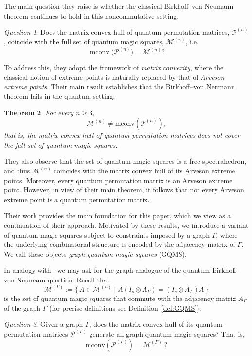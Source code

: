 \documentclass[11pt, a4paper]{article}
\theoremstyle{plain}
\newtheorem{theorem}{Theorem}[section]
\theoremstyle{definition}
\theoremstyle{remark}
\newtheorem{question}[theorem]{Question}
\newcommand{\cM}{\mathcal{M}} \newcommand{\cN}{\mathcal{N}} \newcommand{\cO}{\mathcal{O}}
\newcommand{\cP}{\mathcal{P}} \newcommand{\cQ}{\mathcal{Q}} \newcommand{\cR}{\mathcal{R}}
\newcommand{\cMn}{\mathcal{M}^{(n)}}
\newcommand{\cPn}{\mathcal{P}^{(n)}}
\newcommand{\cPG}{\mathcal{P}^{(\Gamma)}}
\begin{document}
The main question they raise is whether the classical Birkhoff--von Neumann theorem continues to hold in this noncommutative setting.
\begin{question}
Does the matrix convex hull of quantum permutation matrices, \(\cPn\), coincide with the full set of quantum magic squares, \(\cMn\), i.e.
\[
\operatorname{mconv}\bigl(\mathcal{P}^{(n)}\bigr) = \mathcal{M}^{(n)}?
\]
\end{question}
To address this, they adopt the framework of \emph{matrix convexity}, where the classical notion of extreme points is naturally replaced by that of \emph{Arveson extreme points}.  
Their main result establishes that the Birkhoff–von Neumann theorem fails in the quantum setting:

\begin{theorem}\label{thm:DDN}
For every \( n \ge 3 \),
\[
\mathcal{M}^{(n)} \neq \mathrm{mconv}(\mathcal{P}^{(n)}),
\]
that is, the matrix convex hull of quantum permutation matrices does not cover 
the full set of quantum magic squares.
\end{theorem}

They also observe that the set of quantum magic squares is a free spectrahedron, and thus
\(\mathcal{M}^{(n)}\) coincides with the matrix convex hull of its Arveson extreme points. 
Moreover, every quantum permutation matrix is an Arveson extreme point.
However, in view of their main theorem, it follows that not every Arveson extreme point is a quantum permutation matrix.

\medskip

Their work provides the main foundation for this paper, which we view as a continuation of their approach. Motivated by these results, we introduce a  variant of quantum magic squares subject to constraints imposed by a graph \(\Gamma\), where the underlying combinatorial structure is encoded by the adjacency matrix of \(\Gamma\).
We call these objects \emph{graph quantum magic squares} (GQMS).

 

In analogy with \cite{DDN20}, we may ask for the graph-analogue 
of the quantum Birkhoff--von Neumann question. Recall that 
\[
\cM^{(\Gamma)} := \{\,A \in \cM^{(n)} \mid 
A (I_s \otimes A_\Gamma) = (I_s \otimes A_\Gamma) A \,\}
\]
is the set of quantum magic squares that commute with the adjacency matrix 
\(A_\Gamma\) of the graph \(\Gamma\) (for precise definitions see Definition~\ref{def:GQMS}). 

\begin{question}
Given a graph \(\Gamma\), does the matrix convex hull of its quantum permutation 
matrices \(\cPG\) generate all graph quantum magic squares? That is,
\[
\mathrm{mconv}(\cP^{(\Gamma)}) = \cM^{(\Gamma)} \; ?
\]
\end{question}
\end{document}
